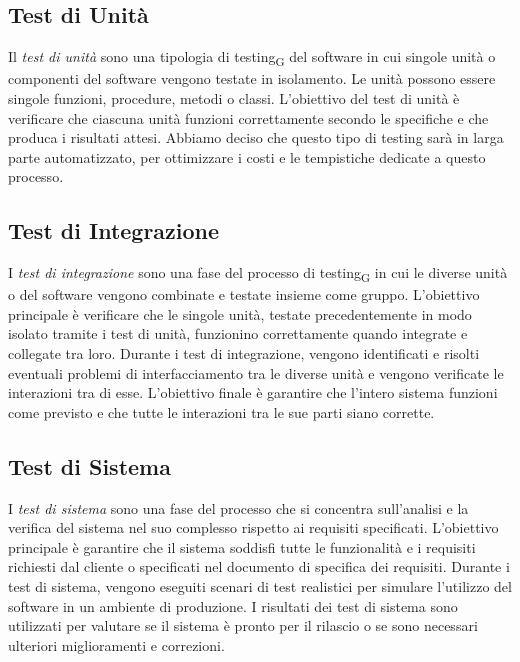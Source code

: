 \documentclass{article}
\begin{document}
{\subsection{Test di Unità}
Il \textit{test di unità} sono una tipologia di testing\textsubscript{G} del software in cui singole unità o componenti del software vengono testate in isolamento. Le unità possono essere singole funzioni, procedure, metodi o classi. L'obiettivo del test di unità è verificare che ciascuna unità funzioni correttamente secondo le specifiche e che produca i risultati attesi. Abbiamo deciso che questo tipo di testing sarà in larga parte automatizzato, per ottimizzare i costi e le tempistiche dedicate a questo processo.

\subsection{Test di Integrazione}
I \textit{test di integrazione} sono una fase del processo di testing\textsubscript{G} in cui le diverse unità o del software vengono combinate e testate insieme come gruppo. L'obiettivo principale è verificare che le singole unità, testate precedentemente in modo isolato tramite i test di unità, funzionino correttamente quando integrate e collegate tra loro. Durante i test di integrazione, vengono identificati e risolti eventuali problemi di interfacciamento tra le diverse unità e vengono verificate le interazioni tra di esse. L'obiettivo finale è garantire che l'intero sistema funzioni come previsto e che tutte le interazioni tra le sue parti siano corrette.

\subsection{Test di Sistema}
I \textit{test di sistema} sono una fase del processo che si concentra sull'analisi e la verifica del sistema nel suo complesso rispetto ai requisiti specificati. L'obiettivo principale è garantire che il sistema soddisfi tutte le funzionalità e i requisiti richiesti dal cliente o specificati nel documento di specifica dei requisiti. Durante i test di sistema, vengono eseguiti scenari di test realistici per simulare l'utilizzo del software in un ambiente di produzione. I risultati dei test di sistema sono utilizzati per valutare se il sistema è pronto per il rilascio o se sono necessari ulteriori miglioramenti e correzioni.

}
\end{document}
